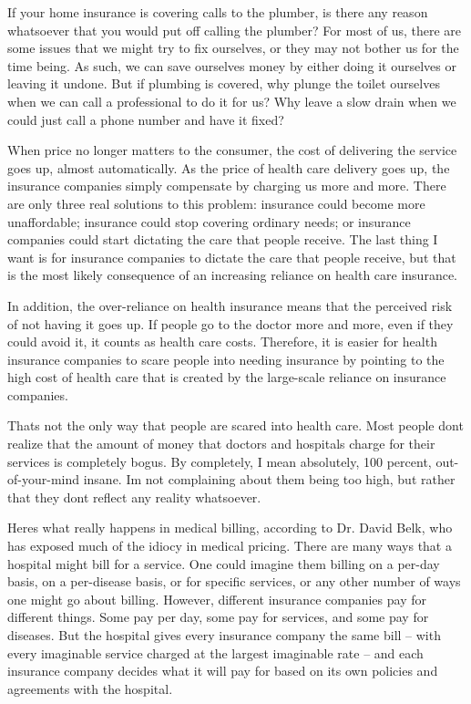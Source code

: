 If your home insurance is covering calls to the plumber, is there any
reason whatsoever
that you would put off calling the plumber?  For most of us, there are
some issues that we might try to fix ourselves, or they may not bother
us for the time being. As such, we can save ourselves money by either
doing it ourselves or leaving it undone.
But if plumbing is
covered, why plunge the toilet ourselves when we can call a
professional to do it for us?  Why leave a slow drain when we could
just call a phone number and have it fixed? 


When price no longer matters to the consumer, the cost of delivering the
service goes up, almost automatically. As the price of health care
delivery goes up, the insurance companies simply compensate by charging
us more and more. There are only three real solutions to this problem:
insurance could become more unaffordable; insurance could stop covering
ordinary needs; or insurance companies could start dictating the care
that people receive. The last thing I want is for insurance companies
to dictate the care that people receive, but that is the most likely
consequence of an increasing reliance on health care insurance.


In addition, the over-reliance on health insurance means that the
perceived risk of not having it goes up. If people go to the doctor
more and more, even if they could avoid it, it counts as health care
costs. Therefore, it is easier for health insurance companies to scare
people into needing insurance by pointing to the high cost of health
care that is created by the large-scale reliance on insurance
companies. 


That{\textquotesingle}s not the only way that people are scared into
health care. Most people don{\textquotesingle}t realize that the amount
of money that doctors and hospitals charge for their services is
completely bogus. By completely, I mean absolutely, 100 percent,
out-of-your-mind insane. I{\textquotesingle}m not complaining about
them being too high, but rather that they don{\textquotesingle}t
reflect any reality whatsoever. 


Here{\textquotesingle}s what really happens in medical billing,
according to Dr. David Belk, who has exposed much of the idiocy in
medical pricing. There are many ways that a hospital might bill for a
service. One could imagine them billing on a per-day basis, on a
per-disease basis, or for specific services, or any
other number of ways
one might go about billing. However, different insurance companies pay
for different things. Some pay per day, some pay for services, and some
pay for diseases.  But the hospital gives every insurance company the
same bill – with every imaginable service charged at the largest
imaginable rate – and each insurance company decides what it will pay
for based on its own policies and agreements with the hospital.


